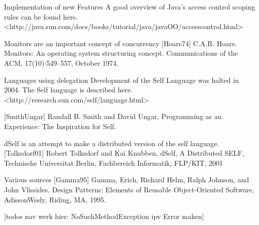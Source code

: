 \documentclass[a4paper,12pt]{book}
\begin{document}
Implementation of new Features
A good overview of Java's access control scoping rules can be found here.
<http://java.sun.com/docs/books/tutorial/java/javaOO/accesscontrol.html>

Monitors are an important concept of concurrency
[Hoare74] C.A.R. Hoare. Monitors: An operating system structuring concept. Communications of the ACM, 17(10):549--557, October 1974.

Languages using delegation
Development of the Self Language was halted in 2004. The Self language is described here.
<http://research.sun.com/self/language.html>

[SmithUngar] Randall B. Smith and David Ungar, Programming as an Experience: The Inspiration for Self.

dSelf is an attempt to make a distributed version of the self language.
[Tolksdorf01]
Robert Tolksdorf and Kai Knubben, dSelf, A Distributed SELF, Technische Universitat Berlin, Fachbereich Informatik, FLP/KIT, 2001

Various sources
[Gamma95] Gamma, Erich, Richard Helm, Ralph Johnson, and John Vlissides. Design Patterns: Elements of Reusable Object-Oriented Software, AdissonWesly, Riding, MA, 1995.

[todos nav werk hier:
NoSuchMethodException ipv Error maken]
\end{document}
